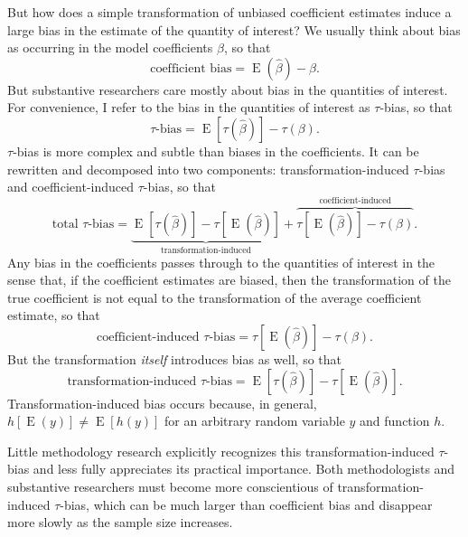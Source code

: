 \documentclass[12pt]{article}
\DeclareMathOperator*{\E}{\text{E}}
\begin{document}
But how does a simple transformation of unbiased coefficient estimates induce a large bias in the estimate of the quantity of interest?
We usually think about bias as occurring in the model coefficients $\beta$, so that 
\begin{equation}
\text{coefficient bias} = \E(\hat{\beta}) - \beta \text{.}  \nonumber
\end{equation}
But substantive researchers care mostly about bias in the quantities of interest. 
For convenience, I refer to the bias in the quantities of interest as $\tau$-bias, so that
\begin{equation}
\tau\text{-bias} = \E[\tau(\hat{\beta})] - \tau(\beta)\text{.} \nonumber
\end{equation}
$\tau$-bias is more complex and subtle than biases in the coefficients. 
It can be rewritten and decomposed into two components: transformation-induced $\tau$-bias and coefficient-induced $\tau$-bias, so that
\begin{equation}
\text{total } \tau\text{-bias}= \underbrace{ \E[\tau(\hat{\beta})]-  \tau[\E(\hat{\beta})]  }_{\text{transformation-induced}} + \overbrace{  \tau[\E(\hat{\beta})] - \tau(\beta)  }^{\text{coefficient-induced}}\text{.} \nonumber
\end{equation}
Any bias in the coefficients passes through to the quantities of interest in the sense that, if the coefficient estimates are biased, then the transformation of the true coefficient is not equal to the transformation of the average coefficient estimate, so that
\begin{equation}
\text{coefficient-induced } \tau\text{-bias} = \tau[\E(\hat{\beta})] - \tau(\beta) \text{.}\nonumber
\end{equation}
But the transformation \textit{itself} introduces bias as well, so that
\begin{equation}
\text{transformation-induced } \tau\text{-bias} = \E[\tau(\hat{\beta})]-  \tau[\E(\hat{\beta})] \text{.}\nonumber
\end{equation}
Transformation-induced bias occurs because, in general, $h[\E(y)] \neq \E[h(y)]$ for an arbitrary random variable $y$ and function $h$.

Little methodology research explicitly recognizes this transformation-induced $\tau$-bias and less fully appreciates its practical importance. 
Both methodologists and substantive researchers must become more conscientious of transformation-induced $\tau$-bias, which can be much larger than coefficient bias and disappear more slowly as the sample size increases.
\end{document}
